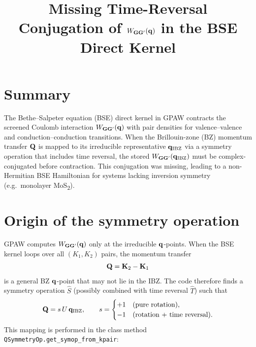 \documentclass[11pt,a4paper]{article}
\title{Missing Time-Reversal Conjugation of $W_{\vb{GG}'}(\vb{q})$
       in the BSE Direct Kernel}
\author{}
\date{}
\begin{document}
\maketitle

\section{Summary}

The Bethe--Salpeter equation (BSE) direct kernel in GPAW contracts the
screened Coulomb interaction $W_{\vb{GG}'}(\vb{q})$ with pair densities
for valence--valence and conduction--conduction transitions.  When
the Brillouin-zone (BZ) momentum transfer $\vb{Q}$ is mapped to its
irreducible representative $\vb{q}_\text{IBZ}$ via a symmetry operation
that includes time reversal, the stored $W_{\vb{GG}'}(\vb{q}_\text{IBZ})$
must be complex-conjugated before contraction.  This conjugation was
missing, leading to a non-Hermitian BSE Hamiltonian for systems lacking
inversion symmetry (e.g.\ monolayer MoS\textsubscript{2}).

\section{Origin of the symmetry operation}

GPAW computes $W_{\vb{GG}'}(\vb{q})$ only at the irreducible
$\vb{q}$-points.  When the BSE kernel loops over all $(K_1, K_2)$
pairs, the momentum transfer
\begin{equation}
  \vb{Q} = \vb{K}_2 - \vb{K}_1
\end{equation}
is a general BZ $\vb{q}$-point that may not lie in the IBZ.  The code
therefore finds a symmetry operation $\hat{S}$ (possibly combined with
time reversal $\hat{T}$) such that
\begin{equation}\label{eq:qmap}
  \vb{Q} = s\, U \,\vb{q}_\text{IBZ},
  \qquad
  s = \begin{cases} +1 & \text{(pure rotation)}, \\
                     -1 & \text{(rotation + time reversal)}.
  \end{cases}
\end{equation}
This mapping is performed in the class method
\texttt{QSymmetryOp.get\_symop\_from\_kpair}:
\end{document}
